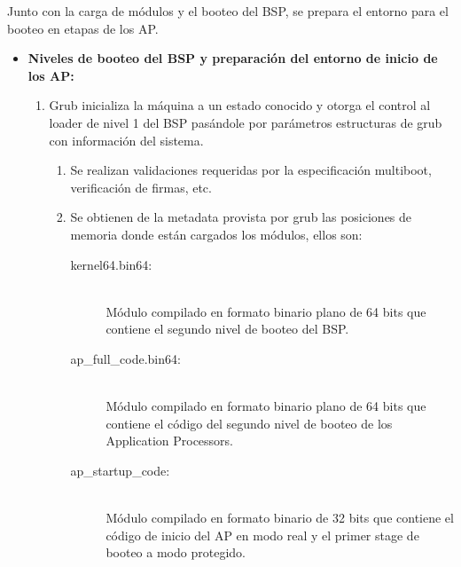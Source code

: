 	Junto con la carga de módulos y el booteo del BSP, se prepara el entorno para el booteo en etapas de los AP.\\
	\begin{itemize}
		\item \textbf{Niveles de booteo del BSP y preparación del entorno de inicio de los AP:} 
			\begin{enumerate}
				\item Grub inicializa la máquina a un estado conocido y otorga el control al loader de nivel 1 del BSP pasándole por parámetros estructuras de grub con información del sistema.
				\begin{enumerate}
					\item Se realizan validaciones requeridas por la especificación multiboot, verificación de firmas, etc.
					
					\item Se obtienen de la metadata provista por grub las posiciones de memoria donde están cargados los módulos, ellos son:
					\vspace{0.1cm}
					\begin{description}
						\item [kernel64.bin64:] \hfill \\
							Módulo compilado en formato binario plano de 64 bits que contiene el segundo nivel de booteo del BSP.
						\item [ap\_full\_code.bin64:] \hfill \\
							Módulo compilado en formato binario plano de 64 bits que contiene el código del segundo nivel de booteo de los Application Processors.
						\item [ap\_startup\_code:] \hfill \\
							Módulo compilado en formato binario de 32 bits que contiene el código de inicio del AP en modo real y el primer stage de booteo a modo protegido.
					\end{description}
					\vspace{0.5cm}
					

\end{enumerate}
\end{enumerate}
\end{itemize}
